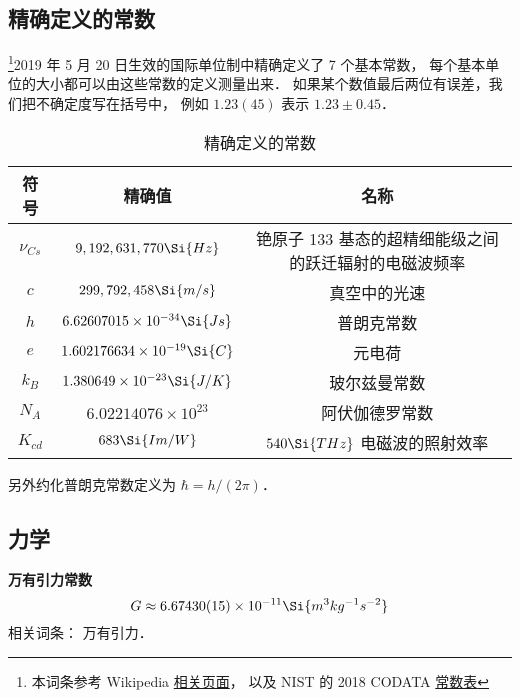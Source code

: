 
\begin{issues}
\issueTODO
{}
\end{issues}


\subsection{精确定义的常数}
\footnote{本词条参考 Wikipedia \href{https://en.wikipedia.org/wiki/Physical_constant}{相关页面}， 以及 NIST 的 2018 CODATA \href{https://physics.nist.gov/cuu/Constants/Table/allascii.txt}{常数表}}2019 年 5 月 20 日生效的国际单位制中精确定义了 7 个基本常数， 每个基本单位的大小都可以由这些常数的定义测量出来． 如果某个数值最后两位有误差，我们把不确定度写在括号中， 例如 $1.23(45)$ 表示 $1.23 \pm 0.45$．
\begin{table}[ht]
\centering
\caption{精确定义的常数}\label{Consts_tab1}
\begin{tabular}{|c|c|c|}
\hline
符号 & 精确值 & 名称 \\
\hline
$\nu_{Cs}$ & $9,192,631,770\Si{Hz}$ & 铯原子 133 基态的超精细能级之间的跃迁辐射的电磁波频率 \\
\hline
$c$ & $299,792,458\Si{m/s}$ & 真空中的光速 \\
\hline
$h$ & $6.62607015\times 10^{-34}\Si{Js}$ & 普朗克常数 \\
\hline
$e$ & $1.602176634\times 10^{-19}\Si{C} $ & 元电荷 \\
\hline
$k_B$ & $1.380649\times 10^{-23} \Si{J/K}$ & 玻尔兹曼常数 \\
\hline
$N_A$ & $6.02214076\times 10^{23} $ & 阿伏伽德罗常数 \\
\hline
$K_{cd}$ & $683\Si{Im/W}$ & $540\Si{THz}$ 电磁波的照射效率 \\
\hline
\end{tabular}
\end{table}
另外约化普朗克常数定义为 $\hbar = h/(2\pi)$．


\subsection{力学}
\textbf{万有引力常数}
\begin{equation}
G \approx 6.67430(15)\times 10^{-11} \Si{m^3 kg^{-1} s^{-2}}
\end{equation}
相关词条： 万有引力．

